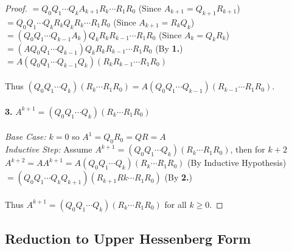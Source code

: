 \documentclass[12pt]{article}
\begin{document}
\begin{proof}
    \indent $= Q_0 Q_1 \cdots Q_k A_{k+1} R_k \cdots R_1 R_0$ (Since $A_{k+1} = Q_{k+1} R_{k+1}$) \\
    \indent $= Q_0 Q_1 \cdots Q_k R_k Q_k R_k \cdots R_1 R_0$ (Since $A_{k+1} = R_k Q_k$) \\
    \indent $= (Q_0 Q_1 \cdots Q_{k-1} A_k) Q_k R_k R_{k-1} \cdots R_1 R_0$ (Since $A_k = Q_k R_k$) \\
    \indent $= (AQ_0 Q_1 \cdots Q_{k-1}) Q_k R_k R_{k-1} \cdots R_1 R_0$ (By \textbf{1.}) \\
    \indent $= A(Q_0 Q_1 \cdots Q_{k-1} Q_k) (R_k R_{k-1} \cdots R_1 R_0)$ \\ \\
    Thus $(Q_0 Q_1 \cdots Q_k)(R_k \cdots R_1 R_0) = A(Q_0 Q_1 \cdots Q_{k-1})(R_{k-1} \cdots R_1 R_0)$. \\ \\
    \textbf{3.} $A^{k+1} = (Q_0 Q_1 \cdots Q_k) (R_k \cdots R_1 R_0)$ \\ \\
    \textit{Base Case:} $k = 0$ so $A^1 = Q_0 R_0 = QR = A$ \\
    \textit{Inductive Step:} Assume $A^{k+1} = (Q_0 Q_1 \cdots Q_k) (R_k \cdots R_1 R_0)$, then for $k+2$ \\
    \indent $A^{k+2} = A A^{k+1} = A (Q_0 Q_1 \cdots Q_k) (R_k \cdots R_1 R_0)$ (By Inductive Hypothesis) \\
    \indent $= (Q_0 Q_1 \cdots Q_kQ_{k+1})(R_{k+1}R{k} \cdots R_1 R_0)$ (By \textbf{2.}) \\ \\
    Thus $A^{k+1} = (Q_0 Q_1 \cdots Q_k) (R_k \cdots R_1 R_0)$ for all $k \geq 0$.
\end{proof}

\subsection{Reduction to Upper Hessenberg Form}
\end{document}
